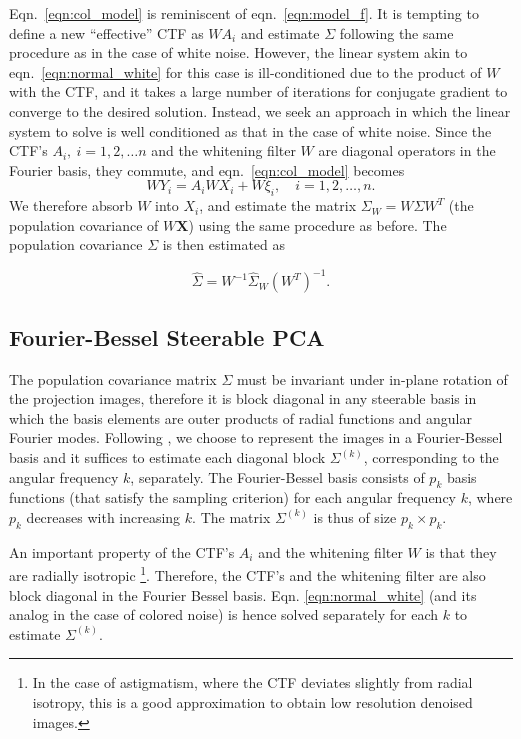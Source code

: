\documentclass[review]{elsarticle}
\begin{document}
Eqn.\ \ref{eqn:col_model} is reminiscent of eqn.\ \ref{eqn:model_f}. It is tempting to define a new 
``effective'' CTF as $WA_{i}$ and estimate
$\Sigma$ following the same procedure as in the case of white noise. However, 
the linear system akin to eqn.\ \ref{eqn:normal_white} for this case
is ill-conditioned due to the product of $W$ with the CTF, and it 
takes a large number of iterations for conjugate gradient 
to converge to the desired solution. Instead, we seek an approach in which the 
linear system to solve is well conditioned as that
in the case of white noise.
Since the CTF's $A_i,\ i=1,2, \ldots n$ 
and the whitening filter $W$ are diagonal operators in the Fourier basis, they 
commute, and eqn.\ \ref{eqn:col_model} becomes
\begin{equation}
WY_i=A_{i}WX_i + W\xi_i, \quad i=1,2,\ldots,n.
\label{eqn:model_col}
\end{equation}
We therefore 
absorb $W$ into $X_i$, and estimate the matrix $\Sigma_W = 
W\Sigma W^T$ (the population covariance of $W \textbf{X}$) using the same procedure as before.
The population covariance $\Sigma$ is then estimated as

\begin{equation}
\hat{\Sigma} = W^{-1} \hat{\Sigma}_W (W^T)^{-1} .
\end{equation}


\subsection{Fourier-Bessel Steerable PCA}
\label{sec:fb_basis}
The population covariance matrix $\Sigma$ must be invariant under in-plane 
rotation of the projection images, therefore it is block diagonal in any steerable basis in which the 
basis elements are outer products of radial functions and angular Fourier modes. 
Following \cite{ffbspca}, we 
choose to represent the images in a Fourier-Bessel basis and it suffices to 
estimate each diagonal block $\Sigma^{(k)}$, corresponding to the angular frequency $k$, separately. 
The Fourier-Bessel basis \cite{ffbspca} consists of $p_k$ basis functions (that satisfy
the sampling criterion) for each angular frequency $k$, where $p_k$ decreases with increasing $k$.
The matrix $\Sigma^{(k)}$ is thus of size $p_k \times p_k$.

An important property
of the CTF's $A_i$ and the whitening filter $W$ is that they are radially isotropic \footnote{In the case of
astigmatism, where the CTF deviates slightly from radial isotropy, this is a 
good approximation to obtain low resolution
denoised images.}. 
Therefore, the CTF's and the whitening filter
are also block diagonal in the Fourier Bessel basis. Eqn. 
\ref{eqn:normal_white} (and its analog in the case of colored noise)
is hence solved separately for each $k$ to estimate $\Sigma^{(k)}$.
\end{document}
